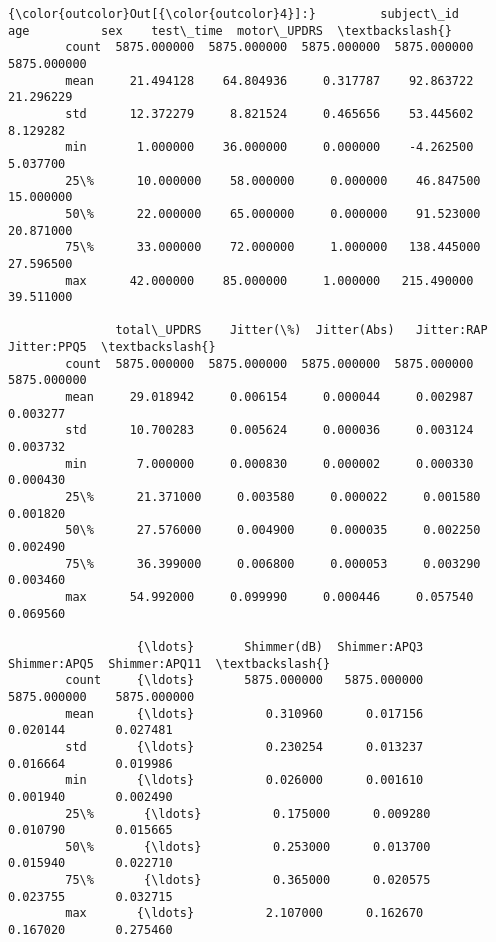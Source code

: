 \documentclass[11pt]{article}
\begin{document}
\begin{Verbatim}[commandchars=\\\{\}]
{\color{outcolor}Out[{\color{outcolor}4}]:}         subject\_id          age          sex    test\_time  motor\_UPDRS  \textbackslash{}
        count  5875.000000  5875.000000  5875.000000  5875.000000  5875.000000   
        mean     21.494128    64.804936     0.317787    92.863722    21.296229   
        std      12.372279     8.821524     0.465656    53.445602     8.129282   
        min       1.000000    36.000000     0.000000    -4.262500     5.037700   
        25\%      10.000000    58.000000     0.000000    46.847500    15.000000   
        50\%      22.000000    65.000000     0.000000    91.523000    20.871000   
        75\%      33.000000    72.000000     1.000000   138.445000    27.596500   
        max      42.000000    85.000000     1.000000   215.490000    39.511000   
        
               total\_UPDRS    Jitter(\%)  Jitter(Abs)   Jitter:RAP  Jitter:PPQ5  \textbackslash{}
        count  5875.000000  5875.000000  5875.000000  5875.000000  5875.000000   
        mean     29.018942     0.006154     0.000044     0.002987     0.003277   
        std      10.700283     0.005624     0.000036     0.003124     0.003732   
        min       7.000000     0.000830     0.000002     0.000330     0.000430   
        25\%      21.371000     0.003580     0.000022     0.001580     0.001820   
        50\%      27.576000     0.004900     0.000035     0.002250     0.002490   
        75\%      36.399000     0.006800     0.000053     0.003290     0.003460   
        max      54.992000     0.099990     0.000446     0.057540     0.069560   
        
                  {\ldots}       Shimmer(dB)  Shimmer:APQ3  Shimmer:APQ5  Shimmer:APQ11  \textbackslash{}
        count     {\ldots}       5875.000000   5875.000000   5875.000000    5875.000000   
        mean      {\ldots}          0.310960      0.017156      0.020144       0.027481   
        std       {\ldots}          0.230254      0.013237      0.016664       0.019986   
        min       {\ldots}          0.026000      0.001610      0.001940       0.002490   
        25\%       {\ldots}          0.175000      0.009280      0.010790       0.015665   
        50\%       {\ldots}          0.253000      0.013700      0.015940       0.022710   
        75\%       {\ldots}          0.365000      0.020575      0.023755       0.032715   
        max       {\ldots}          2.107000      0.162670      0.167020       0.275460   
        

\end{Verbatim}
\end{document}
